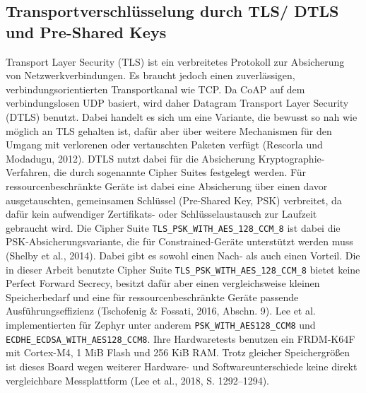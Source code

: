 \subsection{Transportverschlüsselung durch TLS/ DTLS und Pre-Shared Keys}
Transport Layer Security (TLS) ist ein verbreitetes Protokoll zur Absicherung von Netzwerkverbindungen. Es braucht jedoch einen zuverlässigen, verbindungsorientierten Transportkanal wie TCP. Da CoAP auf dem verbindungslosen UDP basiert, wird daher Datagram Transport Layer Security (DTLS) benutzt. Dabei handelt es sich um eine Variante, die bewusst so nah wie möglich an TLS gehalten ist, dafür aber über weitere Mechanismen für den Umgang mit verlorenen oder vertauschten Paketen verfügt (Rescorla und Modadugu, 2012). DTLS nutzt dabei für die Absicherung Kryptographie-Verfahren, die durch sogenannte Cipher Suites festgelegt werden. Für ressourcenbeschränkte Geräte ist dabei eine Absicherung über einen davor ausgetauschten, gemeinsamen Schlüssel (Pre-Shared Key, PSK) verbreitet, da dafür kein aufwendiger Zertifikats- oder Schlüsselaustausch zur Laufzeit gebraucht wird. Die Cipher Suite \lstinline[style=fileinline]|TLS_PSK_WITH_AES_128_CCM_8| ist dabei die PSK-Absicherungsvariante, die für Constrained-Geräte unterstützt werden muss (Shelby et al., 2014). Dabei gibt es sowohl einen Nach- als auch einen Vorteil. Die in dieser Arbeit benutzte Cipher Suite \lstinline[style=fileinline]|TLS_PSK_WITH_AES_128_CCM_8| bietet keine Perfect Forward Secrecy, besitzt dafür aber einen vergleichsweise kleinen Speicherbedarf und eine für ressourcenbeschränkte Geräte passende Ausführungseffizienz (Tschofenig \& Fossati, 2016, Abschn. 9). Lee et al. implementierten für Zephyr unter anderem \lstinline[style=fileinline]|PSK_WITH_AES128_CCM8| und \lstinline[style=fileinline]|ECDHE_ECDSA_WITH_AES128_CCM8|. Ihre Hardwaretests benutzen ein FRDM-K64F mit Cortex-M4, 1 MiB Flash und 256 KiB RAM. Trotz gleicher Speichergrößen ist dieses Board wegen weiterer Hardware- und Softwareunterschiede keine direkt vergleichbare Messplattform (Lee et al., 2018, S. 1292–1294).


